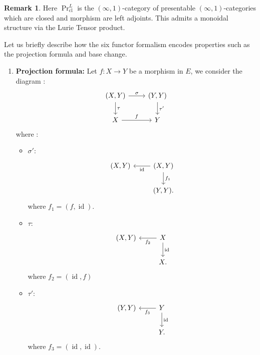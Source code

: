 \documentclass[14pt]{article}
\theoremstyle{definition}
\newtheorem{remark}[theorem]{Remark}
\newcommand{\op}[1]{\operatorname{#1}}
\numberwithin{subsection}{section}
\begin{document}
\begin{remark}
    Here $\op{Pr}^L_{\op{cl}}$ is the $(\infty,1)$-category of presentable $(\infty,1)$-categories which are closed and morphism are left adjoints. This admits a monoidal structure via the Lurie Tensor product. 
\end{remark}
Let us briefly describe how the six functor formalism encodes properties such as the projection formula and base change.
\begin{enumerate}
    \item \textbf{Projection formula:} Let $f: X \to Y$ be a morphism in $E$, we consider the diagram :
    \begin{equation*}
        \begin{tikzcd}
            (X, Y) \arrow[r,"\sigma"] \arrow[d,"\tau"] & (Y,Y) \arrow[d,"\tau'"] \\
            X \arrow[r,"f"] & Y
        \end{tikzcd}
    \end{equation*}
    where :
    \begin{itemize}
        \item $\sigma':$\begin{equation*}
             \begin{tikzcd}
                (X,Y) & \arrow[l," \op{id}"] (X,Y) \arrow[d,"f_1"] \\
                {} & (Y,Y).
            \end{tikzcd}
        \end{equation*}
        where $f_1 = (f,\op{id})$.
        \item $\tau:$ \begin{equation*}
             \begin{tikzcd}
                (X,Y) & \arrow[l,"f_2"]  X \arrow[d,"\op{id}"] \\
               {} & X.
                \end{tikzcd}
        \end{equation*}
        where $f_2=(\op{id},f)$
        \item  $\tau':$\begin{equation*}
             \begin{tikzcd}
                (Y,Y) & Y \arrow[d,"\op{id}"] \arrow[l,"f_3"] \\
                {} & Y.
            \end{tikzcd}
        \end{equation*}
        where $f_3 = (\op{id},\op{id})$.
    \end{itemize}


\end{enumerate}
\end{document}
